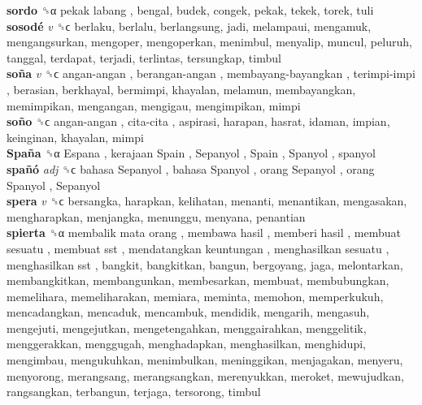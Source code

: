 \textbf{sordo} ␝α   pekak labang , bengal, budek, congek, pekak, tekek, torek, tuli  \\
\textbf{sosodé} \emph{v}  ␝ϲ  berlaku, berlalu, berlangsung, jadi, melampaui, mengamuk, mengangsurkan, mengoper, mengoperkan, menimbul, menyalip, muncul, peluruh, tanggal, terdapat, terjadi, terlintas, tersungkap, timbul  \\
\textbf{soña} \emph{v}  ␝ϲ   angan-angan ,  berangan-angan ,  membayang-bayangkan ,  terimpi-impi , berasian, berkhayal, bermimpi, khayalan, melamun, membayangkan, memimpikan, mengangan, mengigau, mengimpikan, mimpi  \\
\textbf{soño} ␝ϲ   angan-angan ,  cita-cita , aspirasi, harapan, hasrat, idaman, impian, keinginan, khayalan, mimpi  \\
\textbf{Spaña} ␝α   Espana ,  kerajaan Spain ,  Sepanyol ,  Spain ,  Spanyol , spanyol  \\
\textbf{spañó} \emph{adj}  ␝ϲ   bahasa Sepanyol ,  bahasa Spanyol ,  orang Sepanyol ,  orang Spanyol ,  Sepanyol   \\
\textbf{spera} \emph{v}  ␝ϲ  bersangka, harapkan, kelihatan, menanti, menantikan, mengasakan, mengharapkan, menjangka, menunggu, menyana, penantian  \\
\textbf{spierta} ␝α   membalik mata orang ,  membawa hasil ,  memberi hasil ,  membuat sesuatu ,  membuat sst ,  mendatangkan keuntungan ,  menghasilkan sesuatu ,  menghasilkan sst , bangkit, bangkitkan, bangun, bergoyang, jaga, melontarkan, membangkitkan, membangunkan, membesarkan, membuat, membubungkan, memelihara, memeliharakan, memiara, meminta, memohon, memperkukuh, mencadangkan, mencaduk, mencambuk, mendidik, mengarih, mengasuh, mengejuti, mengejutkan, mengetengahkan, menggairahkan, menggelitik, menggerakkan, menggugah, menghadapkan, menghasilkan, menghidupi, mengimbau, mengukuhkan, menimbulkan, meninggikan, menjagakan, menyeru, menyorong, merangsang, merangsangkan, merenyukkan, meroket, mewujudkan, rangsangkan, terbangun, terjaga, tersorong, timbul  \\
